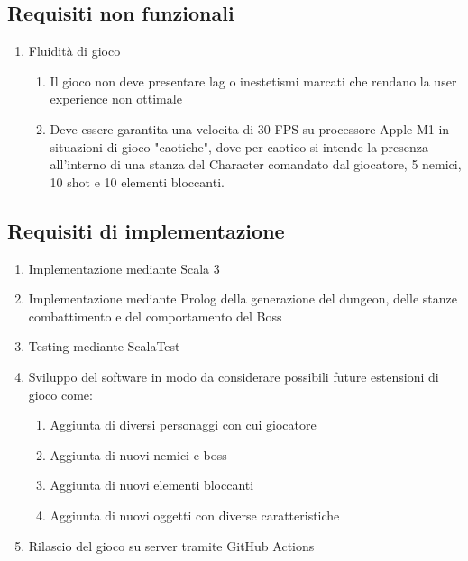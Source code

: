 \subsection{Requisiti non funzionali}

\begin{enumerate}
    \item Fluidità di gioco
    \begin{enumerate}
        \item Il gioco non deve presentare lag o inestetismi marcati che rendano la user experience non ottimale
        \item Deve essere garantita una velocita di 30 FPS su processore Apple M1 in situazioni di gioco "caotiche", dove per caotico si intende la presenza all'interno di una stanza del Character comandato dal giocatore, 5 nemici, 10 shot e 10 elementi bloccanti.
    \end{enumerate}
\end{enumerate}


\subsection{Requisiti di implementazione}

\begin{enumerate}
\item Implementazione mediante Scala 3
\item Implementazione mediante Prolog della generazione del dungeon, delle stanze combattimento e del comportamento del Boss
\item Testing mediante ScalaTest
\item Sviluppo del software in modo da considerare possibili future estensioni di gioco come:
\begin{enumerate}
    \item Aggiunta di diversi personaggi con cui giocatore
    \item Aggiunta di nuovi nemici e boss
    \item Aggiunta di nuovi elementi bloccanti
    \item Aggiunta di nuovi oggetti con diverse caratteristiche
\end{enumerate}
\item Rilascio del gioco su server tramite GitHub Actions
\end{enumerate}